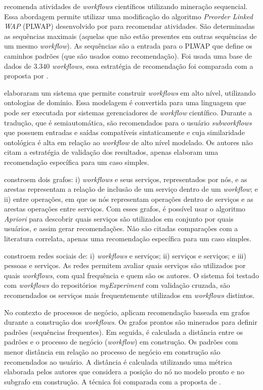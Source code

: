  recomenda atividades de \emph{workflows} científicos utilizando mineração sequencial. Essa abordagem permite utilizar uma modificação do algoritmo \emph{Preorder Linked WAP} (PLWAP) desenvolvido por  para recomendar atividades. São determinadas as sequências maximais (aquelas que não estão presentes em outras sequências de um mesmo \emph{workflow}). As sequências são a entrada para o PLWAP que define os caminhos padrões (que são usados como recomendação). Foi usada uma base de dados de \(3.340\) \emph{workflows}, essa estratégia de recomendação foi comparada com a proposta por .

 elaboraram um sistema que permite construir \emph{workflows} em alto nível, utilizando ontologias de domínio. Essa modelagem é convertida para uma linguagem que pode ser executada por sistemas gerenciadores de \emph{workflow} científico. Durante a tradução, que é semiautomática, são recomendados para o usuário \emph{subworkflows} que possuem entradas e saídas compatíveis sintaticamente e cuja similaridade ontológica é alta em relação ao \emph{workflow} de alto nível modelado. Os autores não citam a estratégia de validação dos resultados, apenas elaboram uma recomendação específica para um caso simples.

 constroem dois grafos: i) \emph{workflows} e seus serviços, representados por nós, e as arestas representam a relação de inclusão de um serviço dentro de um \emph{workflow}; e ii) entre operações, em que os nós representam operações dentro de serviços e as arestas operações entre serviços. Com esses grafos, é possível usar o algoritmo \emph{Apriori} para descobrir quais serviços são utilizados em conjunto por quais usuários, e assim gerar recomendações. Não são citadas comparações com a literatura correlata, apenas uma recomendação específica para um caso simples.

 constroem redes sociais de: i) \emph{workflows} e serviços; ii) serviços e serviços; e iii) pessoas e serviços. As redes permitem avaliar quais serviços são utilizados por quais \emph{workflows}, com qual frequência e quem são os autores. O sistema foi testado com \emph{workflows} do repositórios \emph{myExperiment} \cite{ROURE2015} com validação cruzada, são recomendados os serviços mais frequentemente utilizados em \emph{workflows} distintos.

No contexto de processos de negócio,  aplicam recomendação baseada em grafos durante a construção dos \emph{workflows}. Os grafos prontos são minerados para definir padrões (sequências frequentes). Em seguida, é calculada a distância entre os padrões e o processo de negócio (\emph{workflow}) em construção. Os padrões com menor distância em relação ao processo de negócio em construção são recomendados ao usuário. A distância é calculada utilizando uma métrica elaborada pelos autores que considera a posição do nó no modelo pronto e no subgrafo em construção. A técnica foi comparada com a proposta de .

